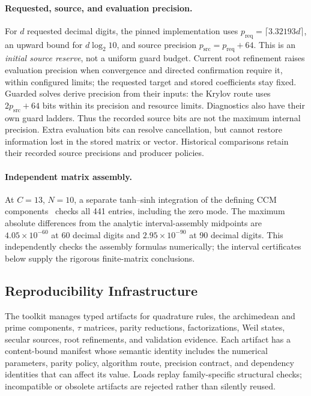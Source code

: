 \documentclass[11pt,a4paper]{article}
\begin{document}
\paragraph{Requested, source, and evaluation precision.}
For $d$ requested decimal digits, the pinned implementation uses
$p_{\mathrm{req}}=\lceil 3.32193d\rceil$, an upward bound for
$d\log_2 10$, and source precision $p_{\mathrm{src}}=p_{\mathrm{req}}+64$.
This is an \emph{initial source reserve}, not a uniform guard budget.
Current root refinement raises evaluation precision when convergence
and directed confirmation require it, within configured limits;
the requested target and stored coefficients stay fixed. Guarded
solves derive precision from their inputs: the Krylov route uses
$2p_{\mathrm{src}}+64$ bits within its precision and resource limits.
Diagnostics also have their own guard ladders. Thus the recorded
source bits are not the maximum internal precision. Extra evaluation
bits can resolve cancellation, but cannot restore information lost
in the stored matrix or vector. Historical comparisons retain their
recorded source precisions and producer policies.

\paragraph{Independent matrix assembly.}
At $C=13$, $N=10$, a separate tanh--sinh integration of the defining
CCM components~\cite[Equations (3.14), (3.16), and (4.4)]{CCM2025}
checks all 441 entries, including the zero mode. The maximum absolute
differences from the analytic interval-assembly midpoints are
$4.05\times10^{-60}$ at 60 decimal digits and $2.95\times10^{-90}$
at 90 decimal digits. This independently checks the assembly formulas
numerically; the interval certificates below supply the rigorous
finite-matrix conclusions.

\subsection{Reproducibility Infrastructure}

The toolkit manages typed artifacts for quadrature rules, the
archimedean and prime components, $\tau$ matrices, parity reductions,
factorizations, Weil states, secular sources, root refinements, and
validation evidence. Each artifact has a content-bound manifest whose
semantic identity includes the numerical parameters, parity policy,
algorithm route, precision contract, and dependency identities that
can affect its value. Loads replay family-specific structural checks;
incompatible or obsolete artifacts are rejected rather than silently
reused.
\end{document}
